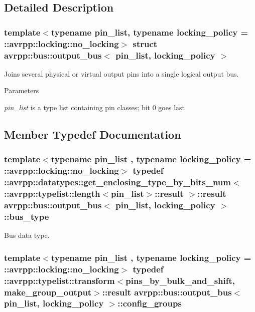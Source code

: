 \subsection{Detailed Description}
\subsubsection*{template$<$typename pin\_\-list, typename locking\_\-policy = ::avrpp::locking::no\_\-locking$>$ struct avrpp::bus::output\_\-bus$<$ pin\_\-list, locking\_\-policy $>$}

Joins several physical or virtual output pins into a single logical output bus. 
\begin{DoxyParams}{Parameters}
\item[{\em pin\_\-list}]is a type list containing pin classes; bit 0 goes last \end{DoxyParams}


\subsection{Member Typedef Documentation}
\hypertarget{structavrpp_1_1bus_1_1output__bus_a02bf22de8447c8097a3c77e0f896a3b4}{
\subsubsection[{bus\_\-type}]{\setlength{\rightskip}{0pt plus 5cm}template$<$typename pin\_\-list , typename locking\_\-policy  = ::avrpp::locking::no\_\-locking$>$ typedef ::{\bf avrpp::datatypes::get\_\-enclosing\_\-type\_\-by\_\-bits\_\-num}$<$ ::{\bf avrpp::typelist::length}$<$pin\_\-list$>$::result $>$::result {\bf avrpp::bus::output\_\-bus}$<$ pin\_\-list, locking\_\-policy $>$::{\bf bus\_\-type}}}
\label{structavrpp_1_1bus_1_1output__bus_a02bf22de8447c8097a3c77e0f896a3b4}


Bus data type. 

\hypertarget{structavrpp_1_1bus_1_1output__bus_a36107557891fe8e1d7d6820be3f41f30}{
\subsubsection[{config\_\-groups}]{\setlength{\rightskip}{0pt plus 5cm}template$<$typename pin\_\-list , typename locking\_\-policy  = ::avrpp::locking::no\_\-locking$>$ typedef ::avrpp::typelist::transform$<${\bf pins\_\-by\_\-bulk\_\-and\_\-shift}, {\bf make\_\-group\_\-output}$>$::result {\bf avrpp::bus::output\_\-bus}$<$ pin\_\-list, locking\_\-policy $>$::{\bf config\_\-groups}}}
\label{structavrpp_1_1bus_1_1output__bus_a36107557891fe8e1d7d6820be3f41f30}


